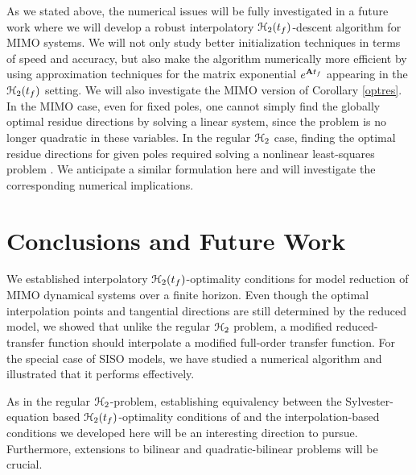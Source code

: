\documentclass[twocolumn]{autart}
\begin{document}
 As we stated above, the numerical issues will be fully investigated  in a future work where we will develop a robust interpolatory $\EuScript{H}_2(t_f)$-descent algorithm for MIMO systems. We will not only study better initialization techniques in terms of speed and accuracy, but also make the algorithm numerically more efficient by using approximation  techniques for the matrix exponential $e^{\mathbf{A} t_f}$ appearing in the $\EuScript{H}_2(t_f)$ setting. 
We will also investigate the MIMO version of Corollary \ref{optres}. In the MIMO case, even for fixed poles, one cannot simply find the globally optimal residue directions by solving a linear system, since the problem is no longer quadratic in these variables. In the regular $\EuScript{H}_2$ case, finding the optimal residue directions for given poles required solving a nonlinear least-squares problem \cite{beattie2012realization}. We anticipate a similar formulation here and will investigate the corresponding numerical implications. 
 

\section{Conclusions and Future Work} \label{sec:conc}
We  established interpolatory $\EuScript{H}_2({t_f})$-optimality conditions for model reduction of MIMO dynamical systems over a finite horizon. Even though the optimal interpolation points and tangential directions are still determined by the reduced model, we showed that unlike the regular $\EuScript{H}_2$ problem, a modified reduced-transfer function should interpolate a modified full-order transfer function. For the special case of SISO models, we have studied a numerical algorithm and illustrated that it performs effectively.

As in the regular $\EuScript{H}_2$-problem, establishing equivalency between the Sylvester-equation based $\EuScript{H}_2(t_f)$-optimality conditions of \cite{GoyR17} and the interpolation-based conditions we developed here will be an interesting direction to pursue. Furthermore, extensions to bilinear and quadratic-bilinear problems will be crucial. 

%



\end{document}
